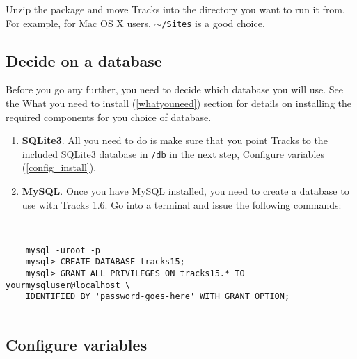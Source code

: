 \documentclass[10pt,twoside]{memoir}
\begin{document}
Unzip the package and move Tracks into the directory you want to run it from. For example, for Mac OS X users, \texttt{\ensuremath{\sim}/Sites} is a good choice.


\subsection{Decide on a database}
\label{database_install}

Before you go any further, you need to decide which database you will use. See the What you need to install (\autoref{whatyouneed}) section for details on installing the required components for you choice of database.


\begin{enumerate}


\item \textbf{SQLite3}. All you need to do is make sure that you point Tracks to the included SQLite3 database in \texttt{/db} in the next step, Configure variables (\autoref{config_install}).

\item \textbf{MySQL}. Once you have MySQL installed, you need to create a database to use with Tracks 1.6. Go into a terminal and issue the following commands:
\end{enumerate}

\begin{adjustwidth}{2.5em}{2.5em}
\begin{verbatim}


    mysql -uroot -p
    mysql> CREATE DATABASE tracks15;
    mysql> GRANT ALL PRIVILEGES ON tracks15.* TO yourmysqluser@localhost \
    IDENTIFIED BY 'password-goes-here' WITH GRANT OPTION;


\end{verbatim}
\end{adjustwidth}

\subsection{Configure variables}
\label{config_install}
\end{document}

